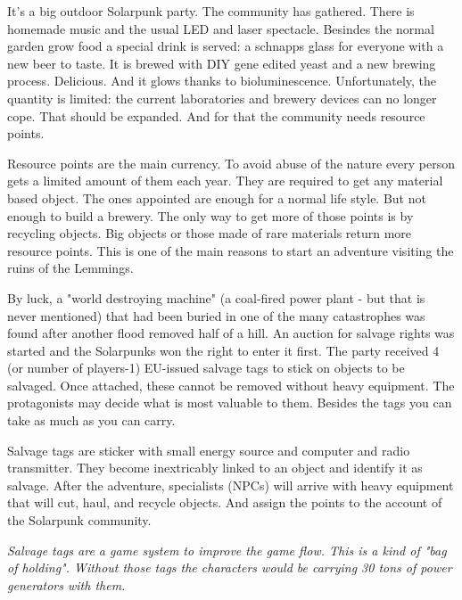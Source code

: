 It's a big outdoor Solarpunk party. The community has gathered. There is homemade music and the usual LED and laser spectacle. Besindes the normal garden grow food a special drink is served: a schnapps glass for everyone with a new beer to taste.
It is brewed with DIY gene edited yeast and a new brewing process. Delicious. And it glows thanks to bioluminescence. Unfortunately, the quantity is limited: the current laboratories and brewery devices can no longer cope. That should be expanded. And for that the community needs resource points.

\begin{sidebarBox}[title=Resource points]
Resource points are the main currency. To avoid abuse of the nature every person gets a limited amount of them each year. They are required to get any material based object. The ones appointed are enough for a normal life style. But not enough to build a brewery. The only way to get more of those points is by recycling objects. Big objects or those made of rare materials return more resource points. This is one of the main reasons to start an adventure visiting the ruins of the Lemmings. 
\end{sidebarBox}

By luck, a "world destroying machine" (a coal-fired power plant - but that is never mentioned) that had been buried in one of the many catastrophes was found after another flood removed half of a hill. An auction for salvage rights was started and the Solarpunks won the right to enter it first.
The party received 4 (or number of players-1) EU-issued salvage tags to stick on objects to be salvaged. Once attached, these cannot be removed without heavy equipment. The protagonists may decide what is most valuable to them. Besides the tags you can take as much as you can carry.

\begin{sidebarBox}[title=Salvage tags]
Salvage tags are sticker with small energy source and computer and radio transmitter. They become inextricably linked to an object and identify it as salvage. After the adventure, specialists (NPCs) will arrive with heavy equipment that will cut, haul, and recycle objects. And assign the points to the account of the Solarpunk community.
\end{sidebarBox}

\emph{Salvage tags are a game system to improve the game flow. This is a kind of "bag of holding". Without those tags the characters would be carrying 30 tons of power generators with them.}

